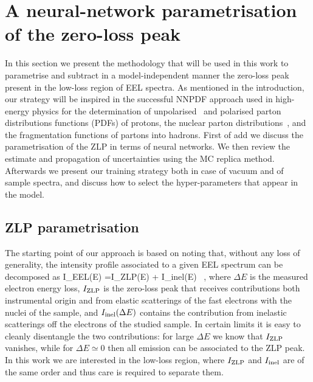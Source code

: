 \section{A neural-network parametrisation of the zero-loss peak}
\label{sec:methodology}

In this section we present the methodology that will be
used in this work to parametrise and subtract in a model-independent manner
the zero-loss peak present in the low-loss region of EEL spectra.
%
As mentioned in the introduction, our strategy will be inspired in the successful
NNPDF approach used in high-energy physics for the determination of
unpolarised~\cite{Ball:2008by,Ball:2012cx,Ball:2014uwa,Ball:2017nwa}
and polarised parton distributions functions (PDFs) of protons, the nuclear
parton distributions~\cite{AbdulKhalek:2020yuc}, and the fragmentation functions of partons into hadrons.
%
First of add we discuss the parametrisation of the ZLP in terms of neural networks.
%
We then review the estimate and propagation of uncertainties using the MC replica method.
%
Afterwards we present our training strategy both in case of vacuum and of sample spectra,
and discuss how to select the hyper-parameters that appear in the model.

\subsection{ZLP parametrisation}
\label{sec:parametrisation}

The starting point of our approach is based on noting that, without any loss of generality, the intensity profile
associated to a given EEL spectrum can be decomposed as
\be
\label{eq:IeelTot}
I_{\rm EEL}(\Delta E) =I_{\rm ZLP}(\Delta E) + I_{\rm inel}(\Delta E) \, ,
\ee
where $\Delta E$ is the measured electron energy loss, $I_{\rm ZLP}$ is the zero-loss peak that receives
contributions both instrumental origin  and from elastic scatterings of the fast electrons with the
nuclei of the sample, and  $I_{\rm inel}(\Delta E)$ contains the contribution from
inelastic scatterings off the electrons of the studied sample.
%
In certain limits it is easy to cleanly disentangle the two contributions: for large $\Delta E$
we know that $I_{\rm ZLP}$ vanishes, while for $\Delta E\simeq 0$ then all emission can be associated to
 the ZLP peak.
%
In this work we are interested in the low-loss region, where $I_{\rm ZLP}$ and $I_{\rm inel}$
are of the same order and thus  care is required to separate them.

